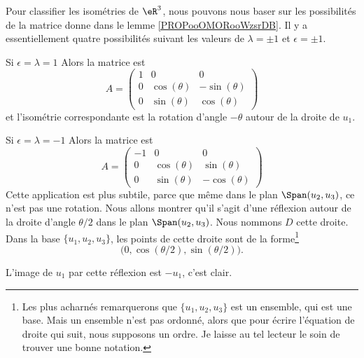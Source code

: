 Pour classifier les isométries de \( \eR^3\), nous pouvons nous baser sur les possibilités de la matrice donne dans le lemme \ref{PROPooOMORooWzsrDB}. Il y a essentiellement quatre possibilités suivant les valeurs de \( \lambda=\pm 1\) et \( \epsilon=\pm 1\).

\begin{subproof}
    \item[Si \( \epsilon=\lambda=1\)] Alors la matrice est
    \begin{equation}
        A=\begin{pmatrix}
            1    &   0    &   0    \\
            0    &   \cos(\theta)    &   -\sin(\theta)    \\
            0    &   \sin(\theta)    &   \cos(\theta)
        \end{pmatrix}
    \end{equation}
    et l'isométrie correspondante est la rotation d'angle \( -\theta\) autour de la droite de \( u_1\).

    \item[Si \( \epsilon=\lambda=-1\)]
    Alors la matrice est
    \begin{equation}
        A=\begin{pmatrix}
            -1    &  0     &   0    \\
            0    &   \cos(\theta)    &   \sin(\theta)    \\
            0    &   \sin(\theta)    &   -\cos(\theta)
        \end{pmatrix}
    \end{equation}
    Cette application est plus subtile, parce que même dans le plan \( \Span(u_2,u_3)\), ce n'est pas une rotation. Nous allons montrer qu'il s'agit d'une réflexion autour de la droite d'angle \( \theta/2\) dans le plan \( \Span(u_2,u_3)\). Nous nommons \( D\) cette droite. Dans la base \( \{ u_1,u_2,u_3 \}\), les points de cette droite sont de la forme\footnote{Les plus acharnés remarquerons que \( \{ u_1,u_2,u_3 \}\) est un ensemble, qui est une base. Mais un ensemble n'est pas ordonné, alors que pour écrire l'équation de droite qui suit, nous supposons un ordre. Je laisse au tel lecteur le soin de trouver une bonne notation.}
    \begin{equation}
        \big( 0,\cos(\theta/2),\sin(\theta/2) \big).
    \end{equation}
    
    L'image de \( u_1\) par cette réflexion est \(-u_1\), c'est clair.


\end{subproof}
